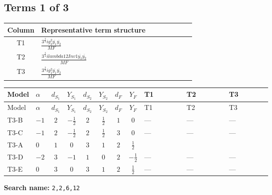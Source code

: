 \documentclass[8pt]{article}
\begin{document}
\begin{landscape}
\subsection*{Terms 1 of 3}
\begin{center}
\begin{tabular}{@{}c >{\raggedright\arraybackslash}p{0.82\linewidth}@{}}
\toprule
Column & Representative term structure \\
\midrule
T1 & \(\displaystyle \frac{3^{\frac{3}{4}} i g_{2}^{2} \overline{y_{1}} \overline{y_{2}}}{MF}\) \\
\midrule
T2 & \(\displaystyle \frac{3^{\frac{3}{4}} i lambda12Inv1 \overline{y_{1}} \overline{y_{2}}}{MF}\) \\
\midrule
T3 & \(\displaystyle \frac{3^{\frac{3}{4}} i g_{1}^{2} \overline{y_{1}} \overline{y_{2}}}{MF}\) \\
\midrule
\bottomrule
\end{tabular}
\end{center}
\smallskip
\tiny
\begin{longtable}{@{}llcccccc >{\raggedright\arraybackslash}p{0.21\linewidth} >{\raggedright\arraybackslash}p{0.21\linewidth} >{\raggedright\arraybackslash}p{0.21\linewidth}@{}}
\toprule
Model & $\alpha$ & $d_{S_1}$ & $Y_{S_1}$ & $d_{S_2}$ & $Y_{S_2}$ & $d_F$ & $Y_F$ & T1 & T2 & T3 \\
\midrule
\endfirsthead
\toprule
Model & $\alpha$ & $d_{S_1}$ & $Y_{S_1}$ & $d_{S_2}$ & $Y_{S_2}$ & $d_F$ & $Y_F$ & T1 & T2 & T3 \\
\midrule
\endhead
T3-B & $-1$ & $2$ & $-\frac{1}{2}$ & $2$ & $\frac{1}{2}$ & $1$ & $0$ & --- & --- & --- \\
\midrule
T3-C & $-1$ & $2$ & $-\frac{1}{2}$ & $2$ & $\frac{1}{2}$ & $3$ & $0$ & --- & --- & --- \\
\midrule
T3-A & $0$ & $1$ & $0$ & $3$ & $1$ & $2$ & $\frac{1}{2}$ & \scriptsize\adjustbox{max width=\linewidth}{$\begin{gathered} - \frac{11 \cdot 3^{\frac{3}{4}} i g_{2}^{2} \overline{y_{1}} \overline{y_{2}}}{8 MF}\end{gathered}$} & \scriptsize\adjustbox{max width=\linewidth}{$\begin{gathered} - \frac{3^{\frac{3}{4}} i lambda12Inv1 \overline{y_{1}} \overline{y_{2}}}{6 MF}\end{gathered}$} & \scriptsize\adjustbox{max width=\linewidth}{$\begin{gathered} - \frac{3^{\frac{3}{4}} i g_{1}^{2} \overline{y_{1}} \overline{y_{2}}}{8 MF}\end{gathered}$} \\
\midrule
T3-D & $-2$ & $3$ & $-1$ & $1$ & $0$ & $2$ & $-\frac{1}{2}$ & --- & --- & --- \\
\midrule
T3-E & $0$ & $3$ & $0$ & $3$ & $1$ & $2$ & $\frac{1}{2}$ & --- & --- & --- \\
\midrule
\bottomrule
\end{longtable}
\clearpage
\noindent\textbf{Search name: }\texttt{2,2,6,12}\par\smallskip

\end{landscape}
\end{document}
